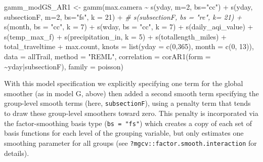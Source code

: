\documentclass[
]{book}
\newenvironment{Shaded}{\begin{snugshade}}{\end{snugshade}}
\newcommand{\AttributeTok}[1]{\textcolor[rgb]{0.77,0.63,0.00}{#1}}
\newcommand{\CommentTok}[1]{\textcolor[rgb]{0.56,0.35,0.01}{\textit{#1}}}
\newcommand{\DecValTok}[1]{\textcolor[rgb]{0.00,0.00,0.81}{#1}}
\newcommand{\FunctionTok}[1]{\textcolor[rgb]{0.00,0.00,0.00}{#1}}
\newcommand{\NormalTok}[1]{#1}
\newcommand{\OtherTok}[1]{\textcolor[rgb]{0.56,0.35,0.01}{#1}}
\newcommand{\SpecialCharTok}[1]{\textcolor[rgb]{0.00,0.00,0.00}{#1}}
\newcommand{\StringTok}[1]{\textcolor[rgb]{0.31,0.60,0.02}{#1}}
\begin{document}
\begin{Shaded}
\begin{Highlighting}[]
\NormalTok{ gamm\_modGS\_AR1 }\OtherTok{\textless{}{-}} \FunctionTok{gamm}\NormalTok{(max.camera }\SpecialCharTok{\textasciitilde{}} 
                           \FunctionTok{s}\NormalTok{(yday, }\AttributeTok{m=}\DecValTok{2}\NormalTok{, }\AttributeTok{bs=}\StringTok{"cc"}\NormalTok{) }\SpecialCharTok{+}
                           \FunctionTok{s}\NormalTok{(yday, subsectionF,}
                             \AttributeTok{m=}\DecValTok{2}\NormalTok{, }\AttributeTok{bs=}\StringTok{"fs"}\NormalTok{, }\AttributeTok{k =} \DecValTok{21}\NormalTok{) }\SpecialCharTok{+}
                           \CommentTok{\# s(subsectionF, bs = "re", k= 21) +}
                           \FunctionTok{s}\NormalTok{(month, }\AttributeTok{bs =} \StringTok{"cc"}\NormalTok{, }\AttributeTok{k =} \DecValTok{7}\NormalTok{) }\SpecialCharTok{+}
                           \FunctionTok{s}\NormalTok{(wday,}
                             \AttributeTok{bs =} \StringTok{"cc"}\NormalTok{, }\AttributeTok{k =} \DecValTok{7}\NormalTok{) }\SpecialCharTok{+}
                           \FunctionTok{s}\NormalTok{(daily\_aqi\_value) }\SpecialCharTok{+}
                           \FunctionTok{s}\NormalTok{(temp\_max\_f) }\SpecialCharTok{+}
                           \FunctionTok{s}\NormalTok{(precipitation\_in, }\AttributeTok{k =} \DecValTok{5}\NormalTok{) }\SpecialCharTok{+}
                          \FunctionTok{s}\NormalTok{(totallength\_miles) }\SpecialCharTok{+} 
\NormalTok{                        total\_traveltime }\SpecialCharTok{+}
\NormalTok{                            max.count,}
                          \AttributeTok{knots =} \FunctionTok{list}\NormalTok{(}\AttributeTok{yday =} \FunctionTok{c}\NormalTok{(}\DecValTok{0}\NormalTok{,}\DecValTok{365}\NormalTok{),}
                                       \AttributeTok{month =} \FunctionTok{c}\NormalTok{(}\DecValTok{0}\NormalTok{, }\DecValTok{13}\NormalTok{)),}
                         \AttributeTok{data =}\NormalTok{ allTrail, }
                         \AttributeTok{method =} \StringTok{"REML"}\NormalTok{, }
                         \AttributeTok{correlation =} \FunctionTok{corAR1}\NormalTok{(}\AttributeTok{form =} \SpecialCharTok{\textasciitilde{}}\NormalTok{yday}\SpecialCharTok{|}\NormalTok{subsectionF),}
                         \AttributeTok{family =}\NormalTok{ poisson)}
\end{Highlighting}
\end{Shaded}

With this model specification we explicitly specifying one term for the global smoother (as in model G, above) then added a second smooth term specifying the group-level smooth terms (here, \texttt{subsectionF}), using a penalty term that tends to draw these group-level smoothers toward zero. This penalty is incorporated via the factor-smoothing basis type (\texttt{bs\ =\ "fs"}) which creates a copy of each set of basis functions for each level of the grouping variable, but only estimates one smoothing parameter for all groups (see \texttt{?mgcv::factor.smooth.interaction} for details).
\end{document}
